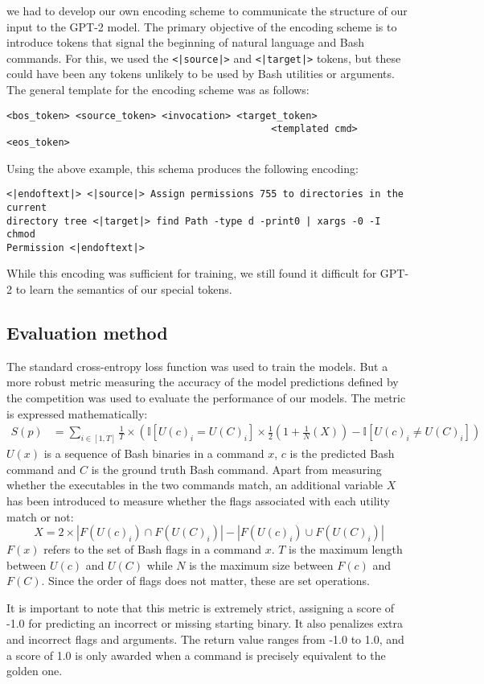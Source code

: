 we had to develop our own encoding scheme to communicate the structure of our
input to the GPT-2 model. The primary objective of the encoding scheme is to
introduce tokens that signal the beginning of natural language and Bash commands. For this, we used the \texttt{<|source|>} and \texttt{<|target|>} tokens, but these could have been any tokens unlikely to be used by Bash utilities or arguments. The general template for the encoding scheme was as follows:
\begin{verbatim}
<bos_token> <source_token> <invocation> <target_token>
                                              <templated cmd> <eos_token> 
\end{verbatim}
Using the above example, this schema produces the following encoding:
\begin{verbatim}
<|endoftext|> <|source|> Assign permissions 755 to directories in the current
directory tree <|target|> find Path -type d -print0 | xargs -0 -I chmod 
Permission <|endoftext|>
\end{verbatim}
While this encoding was sufficient for training, we still found it difficult
for GPT-2 to learn the semantics of our special tokens.


\subsection{Evaluation method}
The standard cross-entropy loss function was used to train the models. But a
more robust metric measuring the accuracy of the model predictions defined by
the competition was used to evaluate the performance of our models. The metric
is expressed mathematically:
\begin{align*}
	S(p) & =\sum_{i\in[1,T]}\frac{1}{T}\times\left(
	\mathbb{I}[U(c)_i=U(C)_i]\times\frac{1}{2}\left(
		1+\frac{1}{N}\left(X\right)\right) -\mathbb{I}[U(c)_i\ne U(C)_i]
	\right)
\end{align*}
$U(x)$ is a sequence of Bash binaries in a command $x$, $c$ is the
predicted Bash command and $C$ is the ground truth Bash command. Apart from
measuring whether the executables in the two commands match, an additional
variable $X$ has been introduced to measure whether the flags associated with
each utility match or not:
\begin{equation*}
	X = 2\times
	|F(U(c)_i)\cap F(U(C)_i)| - |F(U(c)_i)\cup F(U(C)_i)|
\end{equation*}
$F(x)$ refers to the set of Bash flags in a command $x$. $T$ is the
maximum length between $U(c)$ and $U(C)$ while $N$ is the maximum size between
$F(c)$ and $F(C)$. Since the order of flags does not matter, these are set
operations.
\par
It is important to note that this metric is extremely strict, assigning a score
of -1.0 for predicting an incorrect or missing starting binary. It also penalizes
extra and incorrect flags and arguments. The return value ranges from -1.0 to
1.0, and a score of 1.0 is only awarded when a command is precisely equivalent
to the golden one.
